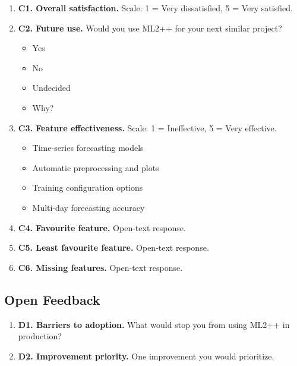 \begin{enumerate}[leftmargin=*]
    \item \textbf{C1. Overall satisfaction.}
    Scale: 1 = Very dissatisfied, 5 = Very satisfied.

    \item \textbf{C2. Future use.}
    Would you use ML2++ for your next similar project?
    \begin{itemize}
        \item Yes
        \item No
        \item Undecided
        \item Why?
    \end{itemize}

    \item \textbf{C3. Feature effectiveness.}
    Scale: 1 = Ineffective, 5 = Very effective.
    \begin{itemize}
        \item Time-series forecasting models
        \item Automatic preprocessing and plots
        \item Training configuration options
        \item Multi-day forecasting accuracy
    \end{itemize}

    \item \textbf{C4. Favourite feature.}
    Open-text response.

    \item \textbf{C5. Least favourite feature.}
    Open-text response.

    \item \textbf{C6. Missing features.}
    Open-text response.
\end{enumerate}

\subsection{Open Feedback}
\label{app:stage3_open_feedback}

\begin{enumerate}[leftmargin=*]
    \item \textbf{D1. Barriers to adoption.}
    What would stop you from using ML2++ in production?

    \item \textbf{D2. Improvement priority.}
    One improvement you would prioritize.
\end{enumerate}

